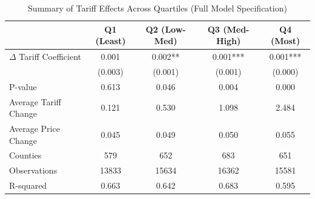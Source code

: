\begin{table}[htbp]
\centering
\caption{Summary of Tariff Effects Across Quartiles (Full Model Specification)}
\label{tab:quartile_summary}
\begin{tabular}{lcccc}
\toprule
{} & Q1 (Least) & Q2 (Low-Med) & Q3 (Med-High) & Q4 (Most) \\
\midrule
$\Delta$ Tariff Coefficient &       0.001 &     0.002** &    0.001*** &  0.001*** \\
                            &     (0.003) &     (0.001) &     (0.001) &   (0.000) \\
P-value                     &       0.613 &       0.046 &       0.004 &     0.000 \\
Average Tariff Change       &       0.121 &       0.530 &       1.098 &     2.484 \\
Average Price Change        &       0.045 &       0.049 &       0.050 &     0.055 \\
Counties                    &         579 &         652 &         683 &       651 \\
Observations                &       13833 &       15634 &       16362 &     15581 \\
R-squared                   &       0.663 &       0.642 &       0.683 &     0.595 \\
\bottomrule
\end{tabular}
\end{table}
